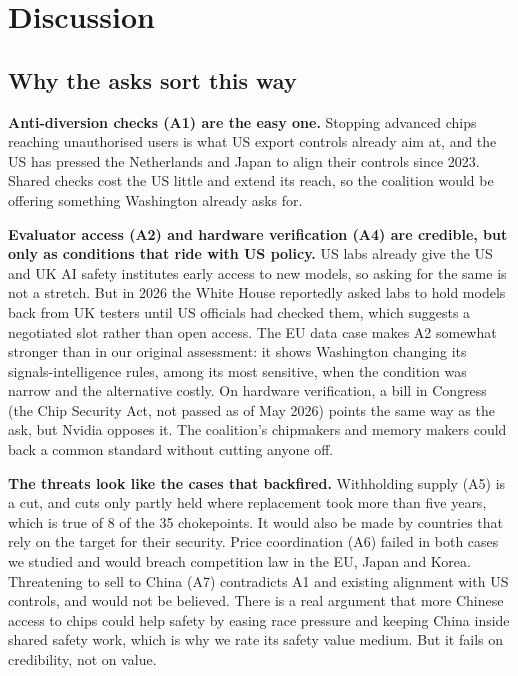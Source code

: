 \documentclass[11pt]{article}
\begin{document}
\section{Discussion}

\subsection{Why the asks sort this way}
\label{sec:why}

\textbf{Anti-diversion checks (A1) are the easy one.} Stopping advanced chips reaching unauthorised users is what US export controls already aim at, and the US has pressed the Netherlands and Japan to align their controls since 2023. Shared checks cost the US little and extend its reach, so the coalition would be offering something Washington already asks for.

\textbf{Evaluator access (A2) and hardware verification (A4) are credible, but only as conditions that ride with US policy.} US labs already give the US and UK AI safety institutes early access to new models, so asking for the same is not a stretch. But in 2026 the White House reportedly asked labs to hold models back from UK testers until US officials had checked them, which suggests a negotiated slot rather than open access. The EU data case makes A2 somewhat stronger than in our original assessment: it shows Washington changing its signals-intelligence rules, among its most sensitive, when the condition was narrow and the alternative costly. On hardware verification, a bill in Congress (the Chip Security Act, not passed as of May 2026) points the same way as the ask, but Nvidia opposes it. The coalition's chipmakers and memory makers could back a common standard without cutting anyone off.

\textbf{The threats look like the cases that backfired.} Withholding supply (A5) is a cut, and cuts only partly held where replacement took more than five years, which is true of 8 of the 35 chokepoints. It would also be made by countries that rely on the target for their security. Price coordination (A6) failed in both cases we studied and would breach competition law in the EU, Japan and Korea. Threatening to sell to China (A7) contradicts A1 and existing alignment with US controls, and would not be believed. There is a real argument that more Chinese access to chips could help safety by easing race pressure and keeping China inside shared safety work, which is why we rate its safety value medium. But it fails on credibility, not on value.
\end{document}
